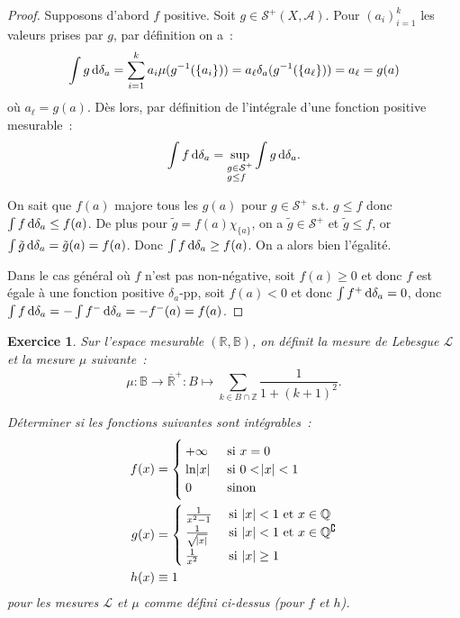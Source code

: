 \documentclass{article}
\newtheorem{ex}{Exercice}[section]
\theoremstyle{definition}
\newcommand{\pinfty}{{+\infty}}
\newcommand{\st}{\text{ s.t. }}
\newcommand{\C}{\complement}
\newcommand{\Z}{{\mathbb Z}}
\newcommand{\Q}{{\mathbb Q}}
\newcommand{\R}{{\mathbb R}}
\newcommand{\B}{{\mathbb B}}
\begin{document}
\begin{proof} Supposons d'abord $f$ positive. Soit $g \in \mathcal S^+(X, \mathcal A)$. Pour $(a_i)_{i=1}^k$ les valeurs prises par $g$, par définition on a~:
\[\int g\dif\delta_a = \sum_{i=1}^ka_i\mu(g^{-1}(\{a_i\})) = a_\ell\delta_a(g^{-1}(\{a_\ell\})) = a_\ell = g(a)\]
où $a_\ell = g(a)$. Dès lors, par définition de l'intégrale d'une fonction positive mesurable~:
\[\int f\dif\delta_a = \sup_{\begin{subarray}{l} g \in \mathcal S^+ \\ g \leq f \end{subarray}}\int g\dif\delta_a.\]

On sait que $f(a)$ majore tous les $g(a)$ pour $g \in \mathcal S^+ \st g \leq f$ donc $\int f\dif\delta_a \leq f(a)$. De plus pour $\tilde g = f(a)\chi_{\{a\}}$, on a
$\tilde g \in \mathcal S^+$ et $\tilde g \leq f$, or $\int \tilde g\dif\delta_a = \tilde g(a) = f(a)$. Donc $\int f\dif\delta_a \geq f(a)$. On a alors bien l'égalité.

Dans le cas général où $f$ n'est pas non-négative, soit $f(a) \geq 0$ et donc $f$ est égale à une fonction positive $\delta_a$-pp, soit $f(a) < 0$ et donc $\int f^+\dif\delta_a = 0$,
donc $\int f\dif\delta_a = -\int f^-\dif\delta_a = -f^-(a) = f(a)$.
\end{proof}

\begin{ex} Sur l'espace mesurable $(\R, \B)$, on définit la mesure de Lebesgue $\mathcal L$ et la mesure $\mu$ suivante~:
\[\mu : \B \to \overline \R^+ : B \mapsto \sum_{k \in B \cap \Z}\frac 1{1 + (k+1)^2}.\]

Déterminer si les fonctions suivantes sont intégrables~:
\begin{align*}
	f(x) &=
	\begin{cases}
		\pinfty &\text{ si } x=0 \\
		\ln\abs x & \text{ si } 0 < \abs x < 1 \\
		0 &\text{ sinon}
	\end{cases} \\
	g(x) &=
	\begin{cases}
		\frac 1{x^2-1} &\text{ si } \abs x < 1 \text{ et } x \in \Q \\
		\frac 1{\sqrt {\abs x}} &\text{ si } \abs x < 1 \text{ et } x \in \Q^\C\\
		\frac 1{x^2} & \text{ si }\abs x \geq 1
	\end{cases} \\
	h(x) &\equiv 1
\end{align*}
pour les mesures $\mathcal L$ et $\mu$ comme défini ci-dessus (pour $f$ et $h$).
\end{ex}
\end{document}
